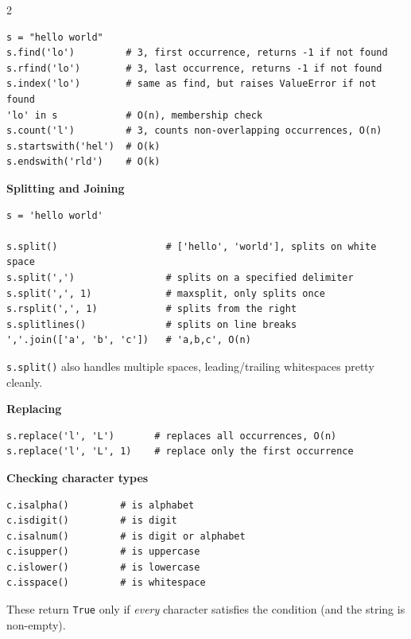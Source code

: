 \documentclass[9pt,a4paper]{extarticle}
\begin{document}
\begin{multicols}{2}
\begin{lstlisting}
s = "hello world"
s.find('lo')         # 3, first occurrence, returns -1 if not found
s.rfind('lo')        # 3, last occurrence, returns -1 if not found
s.index('lo')        # same as find, but raises ValueError if not found
'lo' in s            # O(n), membership check
s.count('l')         # 3, counts non-overlapping occurrences, O(n)
s.startswith('hel')  # O(k)
s.endswith('rld')    # O(k)
\end{lstlisting}

\noindent\textbf{Splitting and Joining}\par\nopagebreak\vspace{1pt}

\begin{lstlisting}
s = 'hello world'

s.split()                   # ['hello', 'world'], splits on white space
s.split(',')                # splits on a specified delimiter
s.split(',', 1)             # maxsplit, only splits once
s.rsplit(',', 1)            # splits from the right
s.splitlines()              # splits on line breaks
','.join(['a', 'b', 'c'])   # 'a,b,c', O(n)
\end{lstlisting}

\texttt{s.\allowbreak{}split(\allowbreak{})} also handles multiple spaces, leading/trailing whitespaces pretty cleanly.


\noindent\textbf{Replacing}\par\nopagebreak\vspace{1pt}

\begin{lstlisting}
s.replace('l', 'L')       # replaces all occurrences, O(n)
s.replace('l', 'L', 1)    # replace only the first occurrence
\end{lstlisting}

\noindent\textbf{Checking character types}\par\nopagebreak\vspace{1pt}

\begin{lstlisting}
c.isalpha()         # is alphabet
c.isdigit()         # is digit
c.isalnum()         # is digit or alphabet
c.isupper()         # is uppercase
c.islower()         # is lowercase
c.isspace()         # is whitespace
\end{lstlisting}

These return \texttt{True} only if \emph{every} character satisfies the condition (and the string is non-empty).



\end{multicols}
\end{document}
